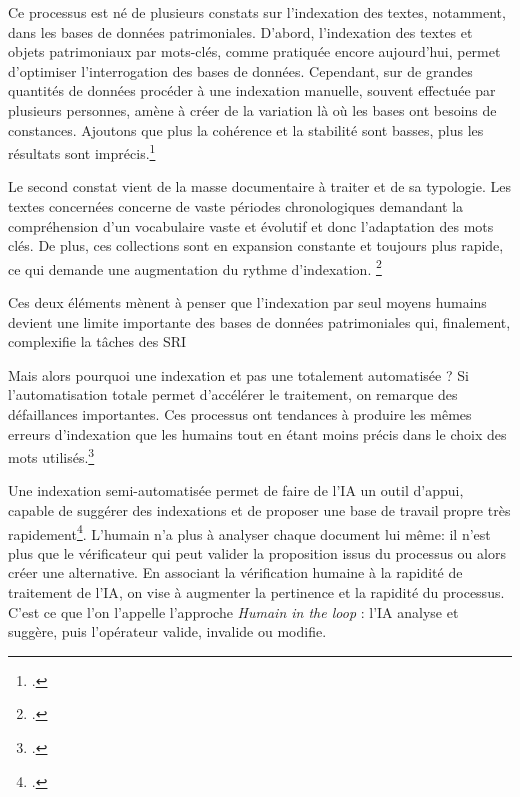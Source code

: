 
\label{réalitéIndexationAuto}


Ce processus est né de plusieurs constats sur l'indexation des textes, notamment, dans les bases de données patrimoniales. D'abord, l'indexation des textes et objets patrimoniaux par mots-clés, comme pratiquée encore aujourd'hui, permet d'optimiser l'interrogation des bases de données. Cependant, sur de grandes quantités de données procéder à une indexation manuelle, souvent effectuée par plusieurs personnes, amène à créer de la variation là où les bases ont besoins de constances. Ajoutons que plus la cohérence et la stabilité sont basses, plus les résultats sont imprécis.\footcite[p.1]{keversIndexationSemiautomatiqueTextes2009} 

Le second constat vient de la masse documentaire à traiter et de sa typologie. Les textes concernées concerne de vaste périodes chronologiques demandant la compréhension d'un vocabulaire vaste et évolutif et donc l'adaptation des mots clés. De plus, ces collections sont en expansion constante et toujours plus rapide, ce qui demande une augmentation du rythme d'indexation. \footcite[p.1]{keversIndexationSemiautomatiqueTextes2009}

Ces deux éléments mènent à penser que l'indexation par seul moyens humains devient une limite importante des bases de données patrimoniales qui, finalement, complexifie la tâches des \gls{SRI}\newline

Mais alors pourquoi une indexation  et pas une totalement automatisée ? Si l'automatisation totale permet d'accélérer le traitement, on remarque des défaillances importantes. Ces processus ont tendances à produire les mêmes erreurs d'indexation que les humains tout en étant moins précis dans le choix des mots utilisés.\footcite[p.1]{keversIndexationSemiautomatiqueTextes2009}

Une indexation semi-automatisée permet de faire de l'\gls{IA} un outil d'appui, capable de suggérer des indexations et de proposer une base de travail propre très rapidement\footcite[p.69 à 71]{hussonIndexationIconographiqueIntelligence2025}. L'humain n'a plus à analyser chaque document lui même: il n'est plus que le vérificateur qui peut valider la proposition issus du processus ou alors créer une alternative. En associant la vérification humaine à la rapidité de traitement de l'\gls{IA}, on vise à augmenter la pertinence et la rapidité du processus. C'est ce que l'on l'appelle l'approche \textit{Humain in the loop} : l'\gls{IA} analyse et suggère, puis l’opérateur valide, invalide ou modifie.\newline

